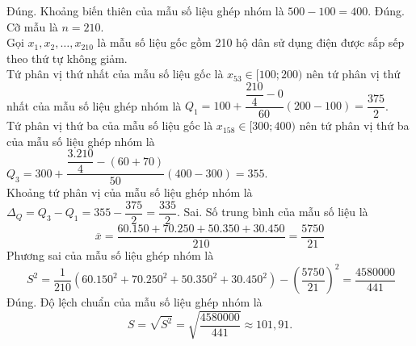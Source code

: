 \begin{ex}
{		\begin{itemchoice}
			\itemch Đúng. Khoảng biến thiên của mẫu số liệu ghép nhóm là $500-100=400$.
			\itemch Đúng. Cỡ mẫu là $n=210$.\\
			Gọi $x_1, x_2, \ldots, x_{210}$ là mẫu số liệu gốc gồm 210 hộ dân sử dụng điện được sắp sếp theo thứ tự không giảm. \\
			Tứ phân vị thứ nhất của mẫu số liệu gốc là $x_{53} \in[100; 200)$ nên tứ phân vị thứ nhất của mẫu số liệu ghép nhóm là $Q_1=100+\dfrac{\dfrac{210}{4}-0}{60}(200-100)=\dfrac{375}{2}$.\\
			Tứ phân vị thứ ba của mẫu số liệu gốc là $x_{158} \in[300; 400)$ nên tứ phân vị thứ ba của mẫu số liệu ghép nhóm là $Q_3=300+\dfrac{\dfrac{3.210}{4}-(60+70)}{50}(400-300)=355$.\\		
			Khoảng tứ phân vị của mẫu số liệu ghép nhóm là $\Delta_Q=Q_3-Q_1=355-\dfrac{375}{2}=\dfrac{335}{2}$.
			\itemch Sai. Số trung bình của mẫu số liệu là
			$$
			\overline{x}=\dfrac{60.150+70.250+50.350+30.450}{210}=\dfrac{5750}{21}
			$$
			Phương sai của mẫu số liệu ghép nhóm là
			$$\
			S^2=\dfrac{1}{210}\left(60.150^2+70.250^2+50.350^2+30.450^2\right)-\left(\dfrac{5750}{21}\right)^2=\dfrac{4580000}{441}
			$$
			\itemch Đúng. Độ lệch chuẩn của mẫu số liệu ghép nhóm là
			$$ S=\sqrt{S^2}=\sqrt{\dfrac{4580000}{441}} \approx 101{,}91.		$$
		\end{itemchoice}
	}
\end{ex}

